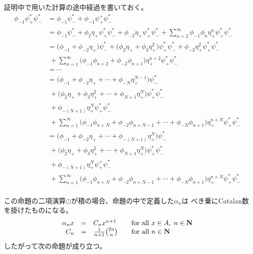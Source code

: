 {	\begin{note}[計算の途中経過その一]\label{note:計算の途中経過その一} %
	証明中で用いた計算の途中経過を書いておく。
		\begin{equation*}\begin{split}
			\phi_{-1}\psi_+^*\psi_-^*
			&= \phi_{-1}\psi_-^* + \phi_{-1}\psi_+^+\psi_-^* \\
			&= \phi_{-1}\psi_-^* + \phi_2\eta_+\psi_+^*\psi_-^*
				+ \phi_{-2}\eta_+\psi_+^*\psi_-^* + \sum_{n=2}^\infty
				\phi_{-1}\phi_n\eta_+^n \psi_+^*\psi_-^* \\
			&= \biggl(\phi_{-1} + \phi_{-2}\eta_+\biggr)\psi_-^* 
				+ \biggl(\phi_2\eta_+ + \phi_3\eta_+^2\biggr)\psi_+^*\psi_-^* 
				+ \phi_{-3}\eta_+^2\psi_+^*\psi_-^* \\
			&\; + \sum_{n=1}^\infty \biggl(
				\phi_{-1}\phi_{n+2} + \phi_{-2}\phi_{n+1}\biggr)\eta_+^{n+2}
				\psi_+^*\psi_-^* \\
			&= \cdots \\
			&= \biggl(\phi_{-1} + \phi_{-2}\eta_+ +\cdots+ \phi_{-N}\eta_+^{N-1}
				\biggr)\psi_-^* \\
			&\; + \biggl(\phi_2\eta_+ + \phi_3\eta_+^2
				+\cdots+ \phi_{N+1}\eta_+^N\biggr)\psi_+^*\psi_-^*  \\
			&\; + \phi_{-(N+1)}\eta_+^N\psi_+^*\psi_-^* \\
			&\; + \sum_{n=1}^\infty \biggl(\phi_{-1}\phi_{n+N} 
				+ \phi_{-2}\phi_{n+N-1} +\cdots+ \phi_{-N}\phi_{n+1}\biggr)
				\eta_+^{n+N}\psi_+^*\psi_-^* \\
			&= \biggl(\phi_{-1} + \phi_{-2}\eta_+ +\cdots+ \phi_{-(N+1)}\eta_+^N
				\biggr)\psi_-^* \\
			&\; + \biggl(\phi_2\eta_+ + \phi_3\eta_+^2
				+\cdots+ \phi_{N+1}\eta_+^N\biggr)\psi_+^*\psi_-^*  \\
			&\; + \phi_{-(N+1)}\eta_+^N\psi_+^+\psi_-^* \\
			&\; + \sum_{n=1}^\infty \biggl(\phi_{-1}\phi_{n+N} 
				+ \phi_{-2}\phi_{n+N-1} +\cdots+ \phi_{-N}\phi_{n+1}\biggr)
				\eta_+^{n+N}\psi_+^*\psi_-^* \\
		\end{split}\end{equation*}
	\end{note} %

	この命題の二項演算$\odot$が積の場合、命題の中で定義した$\alpha_n$は
	べき乗にCatalan数を掛けたものになる。
	\begin{equation*}\begin{array}{rcll}
		\alpha_nx &=& C_nx^{n+1} &\quad\text{for all } x\in A,\; n\in\mathbf{N} \\
		C_n &=& \frac{1}{n+1}\binom{2n}{n} &\quad\text{for all } n\in\mathbf{N} \\
	\end{array}\end{equation*}
	したがって次の命題が成り立つ。

}
